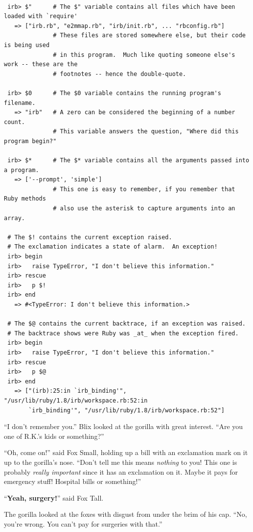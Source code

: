 \documentclass[10pt,twoside]{report}
\begin{document}
\begin{lstlisting}

 irb> $"      # The $" variable contains all files which have been loaded with `require'
   => ["irb.rb", "e2mmap.rb", "irb/init.rb", ... "rbconfig.rb"]
              # These files are stored somewhere else, but their code is being used
              # in this program.  Much like quoting someone else's work -- these are the
              # footnotes -- hence the double-quote.

 irb> $0      # The $0 variable contains the running program's filename.
   => "irb"   # A zero can be considered the beginning of a number count.
              # This variable answers the question, "Where did this program begin?"

 irb> $*      # The $* variable contains all the arguments passed into a program.
   => ['--prompt', 'simple']
              # This one is easy to remember, if you remember that Ruby methods
              # also use the asterisk to capture arguments into an array.

 # The $! contains the current exception raised.
 # The exclamation indicates a state of alarm.  An exception!
 irb> begin
 irb>   raise TypeError, "I don't believe this information."
 irb> rescue
 irb>   p $!
 irb> end
   => #<TypeError: I don't believe this information.>

 # The $@ contains the current backtrace, if an exception was raised.
 # The backtrace shows were Ruby was _at_ when the exception fired.
 irb> begin
 irb>   raise TypeError, "I don't believe this information."
 irb> rescue
 irb>   p $@
 irb> end
   => ["(irb):25:in `irb_binding'", "/usr/lib/ruby/1.8/irb/workspace.rb:52:in
       `irb_binding'", "/usr/lib/ruby/1.8/irb/workspace.rb:52"]

\end{lstlisting}


``I don't remember you.''  Blix looked at the gorilla with great
interest. ``Are you one of R.K.'s kids or something?''

``Oh, come on!'' said Fox Small, holding up a bill with an exclamation
mark on it up to the gorilla's nose. ``Don't tell me this means {\em
  nothing} to you!  This one is probably {\em really important} since
it has an exclamation on it.  Maybe it pays for emergency stuff!
Hospital bills or something!''

``{\bf Yeah, surgery!}'' said Fox Tall.

The gorilla looked at the foxes with disgust from under the brim of
his cap.  ``No, you're wrong.  You can't pay for surgeries with
that.''
\end{document}
